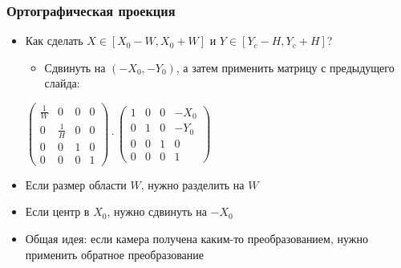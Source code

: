 \documentclass{beamer}
\begin{document}
\begin{frame}[fragile]
\frametitle{Ортографическая проекция}
\begin{itemize}
\item Как сделать \begin{math}X \in [X_0 - W, X_0 + W]\end{math} и \begin{math}Y \in [Y_c - H, Y_c + H]\end{math}?
\pause
\begin{itemize}
\item Сдвинуть на \begin{math}(-X_0, -Y_0)\end{math}, а затем применить матрицу с предыдущего слайда:
\end{itemize}
\begin{center}
\begin{math}
\begin{pmatrix}
\frac{1}{W} & 0 & 0 & 0 \\
0 & \frac{1}{H} & 0 & 0 \\
0 & 0 & 1 & 0 \\
0 & 0 & 0 & 1
\end{pmatrix}
\cdot
\begin{pmatrix}
1 & 0 & 0 & -X_0 \\
0 & 1 & 0 & -Y_0 \\
0 & 0 & 1 & 0 \\
0 & 0 & 0 & 1
\end{pmatrix}
\end{math}
\end{center}
\pause
\item Если размер области \begin{math}W\end{math}, нужно разделить на \begin{math}W\end{math}
\item Если центр в \begin{math}X_0\end{math}, нужно сдвинуть на \begin{math}-X_0\end{math}
\pause
\item Общая идея: если камера получена каким-то преобразованием, нужно применить обратное преобразование
\end{itemize}
\end{frame}
\end{document}
